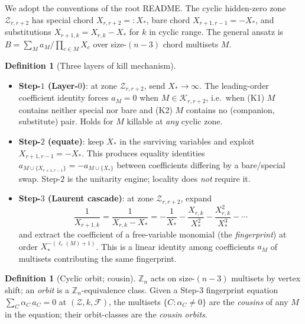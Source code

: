 \documentclass[11pt]{article}
\theoremstyle{definition}
\newtheorem{defn}[thm]{Definition}
\begin{document}
We adopt the conventions of the root README. The cyclic hidden-zero
zone $\mathcal Z_{r,r+2}$ has special chord $X_{r,r+2}=:X_*$, bare
chord $X_{r+1,r-1}=-X_*$, and substitutions $X_{r+1,k}=X_{r,k}-X_*$
for $k$ in cyclic range. The general ansatz is
$B=\sum_M a_M/\prod_{c\in M}X_c$ over size-$(n{-}3)$ chord multisets
$M$.

\begin{defn}[Three layers of kill mechanism]\label{def:layers}\leavevmode\\[-1.2em]
\begin{itemize}[leftmargin=*]
\item \textbf{Step-$1$ (Layer-$0$)}: at zone $\mathcal Z_{r,r+2}$,
send $X_*\to\infty$. The leading-order coefficient identity forces
$a_M=0$ when $M\in\mathcal K_{r,r+2}$, i.e.\ when (K1) $M$ contains
neither special nor bare and (K2) $M$ contains no
(companion, substitute) pair. Holds for $M$ killable at \emph{any}
cyclic zone.

\item \textbf{Step-$2$ (equate)}: keep $X_*$ in the surviving
variables and exploit $X_{r+1,r-1}=-X_*$. This produces equality
identities $a_{M\cup\{X_{r+1,r-1}\}}=-a_{M\cup\{X_*\}}$ between
coefficients differing by a bare/special swap. Step-$2$ is the
unitarity engine; locality does \emph{not} require it.

\item \textbf{Step-$3$ (Laurent cascade)}: at zone $\mathcal Z_{r,r+2}$,
expand
\[
\frac{1}{X_{r+1,k}}=\frac{1}{X_{r,k}-X_*}
=-\frac{1}{X_*}-\frac{X_{r,k}}{X_*^2}-\frac{X_{r,k}^2}{X_*^3}-\cdots
\]
and extract the coefficient of a free-variable monomial (the
\emph{fingerprint}) at order $X_*^{-(\ell_r(M)+1)}$. This is a
linear identity among coefficients $a_M$ of multisets contributing
the same fingerprint.
\end{itemize}
\end{defn}

\begin{defn}[Cyclic orbit; cousin]\label{def:orbit}
$\mathbb Z_n$ acts on size-$(n{-}3)$ multisets by vertex shift; an
\emph{orbit} is a $\mathbb Z_n$-equivalence class. Given a Step-$3$
fingerprint equation $\sum_C\alpha_C\,a_C=0$ at
$(\mathcal Z, k, \mathcal F)$, the multisets
$\{C : \alpha_C \ne 0\}$ are the \emph{cousins} of any $M$ in the
equation; their orbit-classes are the \emph{cousin orbits}.
\end{defn}

\end{document}
